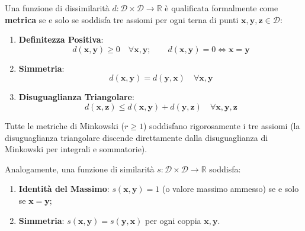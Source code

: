 \begin{definition}
Una funzione di dissimilarità $d: \mathcal{D} \times \mathcal{D} \to \mathbb{R}$ è qualificata formalmente come \textbf{metrica} se e solo se soddisfa tre assiomi per ogni terna di punti $\mathbf{x}, \mathbf{y}, \mathbf{z} \in \mathcal{D}$:
\begin{enumerate}
    \item \textbf{Definitezza Positiva}:
    \begin{equation}
        d(\mathbf{x}, \mathbf{y}) \ge 0 \quad \forall \mathbf{x}, \mathbf{y}; \qquad d(\mathbf{x}, \mathbf{y}) = 0 \iff \mathbf{x} = \mathbf{y}
    \end{equation}
    \item \textbf{Simmetria}:
    \begin{equation}
        d(\mathbf{x}, \mathbf{y}) = d(\mathbf{y}, \mathbf{x}) \quad \forall \mathbf{x}, \mathbf{y}
    \end{equation}
    \item \textbf{Disuguaglianza Triangolare}:
    \begin{equation}
        d(\mathbf{x}, \mathbf{z}) \le d(\mathbf{x}, \mathbf{y}) + d(\mathbf{y}, \mathbf{z}) \quad \forall \mathbf{x}, \mathbf{y}, \mathbf{z}
    \end{equation}
\end{enumerate}
\end{definition}

Tutte le metriche di Minkowski ($r \ge 1$) soddisfano rigorosamente i tre assiomi (la disuguaglianza triangolare discende direttamente dalla disuguaglianza di Minkowski per integrali e sommatorie).

Analogamente, una funzione di similarità $s: \mathcal{D} \times \mathcal{D} \to \mathbb{R}$ soddisfa:
\begin{enumerate}[noitemsep]
    \item \textbf{Identità del Massimo}: $s(\mathbf{x}, \mathbf{y}) = 1$ (o valore massimo ammesso) se e solo se $\mathbf{x} = \mathbf{y}$;
    \item \textbf{Simmetria}: $s(\mathbf{x}, \mathbf{y}) = s(\mathbf{y}, \mathbf{x})$ per ogni coppia $\mathbf{x}, \mathbf{y}$.
\end{enumerate}

\FloatBarrier

